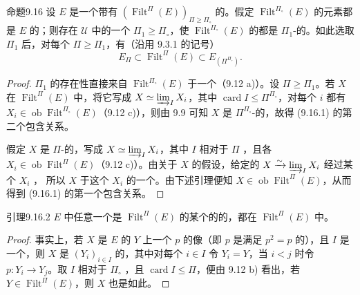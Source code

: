 \begin{SGAresult}{命题}{9.16}
设 $E$ 是一个带有 $(\operatorname{Filt}^\Pi(E))_{\Pi\geq\Pi_\circ}$ 的。假定 $\operatorname{Filt}^{\Pi_\circ}(E)$ 的元素都是 $E$ 的；则存在 $\mathcal U$ 中的一个 $\Pi_1\geq\Pi_\circ$，使 $\operatorname{Filt}^{\Pi_\circ}(E)$ 的都是 $\Pi_1$-的。如此选取 $\Pi_1$ 后，对每个 $\Pi\geq\Pi_1$，有（沿用 9.3.1 的记号）
\[
E_\Pi\subset\operatorname{Filt}^\Pi(E)\subset E_{(\Pi^{\Pi_\circ})}.\tag{9.16.1}
\]
\end{SGAresult}
\begin{proof}
$\Pi_1$ 的存在性直接来自 $\operatorname{Filt}^{\Pi_\circ}(E)$ 于一个（9.12 a)）。设 $\Pi\geq\Pi_1$。若 $X$ 在 $\operatorname{Filt}^\Pi(E)$ 中，将它写成 $X\simeq\varinjlim_I X_i$，其中 $\operatorname{card}I\leq\Pi^{\Pi_\circ}$，对每个 $i$ 都有 $X_i\in\operatorname{ob}\operatorname{Filt}^{\Pi_\circ}(E)$（9.12 c)），则由 9.9 可知 $X$ 是 $\Pi^{\Pi_\circ}$-的，故得 (9.16.1) 的第二个包含关系。

假定 $X$ 是 $\Pi$-的，写成 $X\simeq\varinjlim_I X_i$，其中 $I$ 相对于 $\Pi$ ，且各 $X_i\in\operatorname{ob}\operatorname{Filt}^\Pi(E)$（9.12 c)）。由关于 $X$ 的假设，给定的 $X\xrightarrow{\sim}\varinjlim_I X_i$ 经过某个 $X_i$ ，
所以 $X$ 于这个 $X_i$ 的一个。由下述引理便知 $X\in\operatorname{ob}\operatorname{Filt}^\Pi(E)$，从而得到 (9.16.1) 的第一个包含关系。
\end{proof}

\begin{SGAresult}{引理}{9.16.2}
$E$ 中任意一个是 $\operatorname{Filt}^\Pi(E)$ 的某个的的，都在 $\operatorname{Filt}^\Pi(E)$ 中。
\end{SGAresult}
\begin{proof}
事实上，若 $X$ 是 $E$ 的 $Y$ 上一个 $p$ 的像（即 $p$ 是满足 $p^2=p$ 的），且 $I$ 是一个，则 $X$ 是 $(Y_i)_{i\in I}$ 的，其中对每个 $i\in I$ 令 $Y_i=Y$，当 $i<j$ 时令 $p:Y_i\to Y_j$。取 $I$ 相对于 $\Pi_\circ$ ，且 $\operatorname{card}I\leq\Pi$，便由 9.12 b) 看出，若 $Y\in\operatorname{Filt}^\Pi(E)$，则 $X$ 也是如此。
\end{proof}

